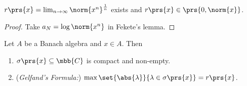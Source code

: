\documentclass[10pt, twoside]{book}
\begin{document}
\begin{corollary}
$r\prs{x} = \lim_{n\to \infty} \norm{x^n}^{\frac{1}{n}}$ exists and $r\prs{x} \in \prs{0, \norm{x}}$.
\end{corollary}

\begin{proof}
Take $a_N = \log \norm{x^n}$ in Fekete's lemma.
\end{proof}

\begin{theorem}[Gelfand]
Let $A$ be a Banach algebra and $x \in A$. Then
\begin{enumerate}
\item $\sigma\prs{x} \subseteq \mbb{C}$ is compact and non-empty.
\item (\emph{Gelfand's Formula:}) $\max\set{\abs{\lambda}}{\lambda \in \sigma\prs{x}} = r\prs{x}$.
\end{enumerate} 
\end{theorem}
\end{document}
